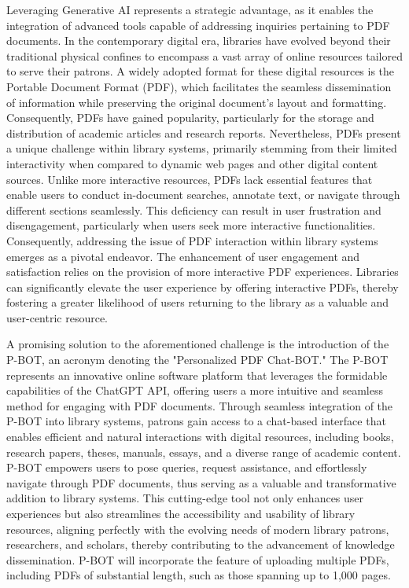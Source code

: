 \documentclass[conference]{IEEEtran}
\begin{document}
Leveraging Generative AI represents a strategic advantage, as it enables the integration of advanced tools capable of addressing inquiries pertaining to PDF documents. In the contemporary digital era, libraries have evolved beyond their traditional physical confines to encompass a vast array of online resources tailored to serve their patrons. A widely adopted format for these digital resources is the Portable Document Format (PDF), which facilitates the seamless dissemination of information while preserving the original document's layout and formatting. Consequently, PDFs have gained popularity, particularly for the storage and distribution of academic articles and research reports. Nevertheless, PDFs present a unique challenge within library systems, primarily stemming from their limited interactivity when compared to dynamic web pages and other digital content sources. Unlike more interactive resources, PDFs lack essential features that enable users to conduct in-document searches, annotate text, or navigate through different sections seamlessly. This deficiency can result in user frustration and disengagement, particularly when users seek more interactive functionalities. Consequently, addressing the issue of PDF interaction within library systems emerges as a pivotal endeavor. The enhancement of user engagement and satisfaction relies on the provision of more interactive PDF experiences. Libraries can significantly elevate the user experience by offering interactive PDFs, thereby fostering a greater likelihood of users returning to the library as a valuable and user-centric resource.

A promising solution to the aforementioned challenge is the introduction of the P-BOT, an acronym denoting the "Personalized PDF Chat-BOT." The P-BOT represents an innovative online software platform that leverages the formidable capabilities of the ChatGPT API, offering users a more intuitive and seamless method for engaging with PDF documents. Through seamless integration of the P-BOT into library systems, patrons gain access to a chat-based interface that enables efficient and natural interactions with digital resources, including books, research papers, theses, manuals, essays, and a diverse range of academic content. P-BOT empowers users to pose queries, request assistance, and effortlessly navigate through PDF documents, thus serving as a valuable and transformative addition to library systems. This cutting-edge tool not only enhances user experiences but also streamlines the accessibility and usability of library resources, aligning perfectly with the evolving needs of modern library patrons, researchers, and scholars, thereby contributing to the advancement of knowledge dissemination. P-BOT will incorporate the feature of uploading multiple PDFs, including PDFs of substantial length, such as those spanning up to 1,000 pages.
\end{document}

